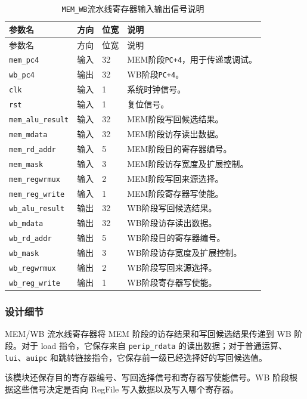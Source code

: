\documentclass[UTF8,a4paper,12pt]{ctexart}
\newcommand{\code}[1]{\texttt{#1}}
\begin{document}
{\footnotesize
\renewcommand{\arraystretch}{1.12}
\begin{longtable}{p{3.2cm}p{1.5cm}p{2.1cm}p{7.0cm}}
\caption{\code{MEM\_WB}流水线寄存器输入输出信号说明}\\
\toprule
参数名 & 方向 & 位宽 & 说明 \\
\midrule
\endfirsthead
\toprule
参数名 & 方向 & 位宽 & 说明 \\
\midrule
\endhead
\code{mem\_pc4} & 输入 & 32 & MEM阶段\code{PC+4}，用于传递或调试。 \\
\code{wb\_pc4} & 输出 & 32 & WB阶段\code{PC+4}。 \\
\code{clk} & 输入 & 1 & 系统时钟信号。 \\
\code{rst} & 输入 & 1 & 复位信号。 \\
\code{mem\_alu\_result} & 输入 & 32 & MEM阶段写回候选结果。 \\
\code{mem\_mdata} & 输入 & 32 & MEM阶段访存读出数据。 \\
\code{mem\_rd\_addr} & 输入 & 5 & MEM阶段目的寄存器编号。 \\
\code{mem\_mask} & 输入 & 3 & MEM阶段访存宽度及扩展控制。 \\
\code{mem\_regwrmux} & 输入 & 2 & MEM阶段写回来源选择。 \\
\code{mem\_reg\_write} & 输入 & 1 & MEM阶段寄存器写使能。 \\
\code{wb\_alu\_result} & 输出 & 32 & WB阶段写回候选结果。 \\
\code{wb\_mdata} & 输出 & 32 & WB阶段访存读出数据。 \\
\code{wb\_rd\_addr} & 输出 & 5 & WB阶段目的寄存器编号。 \\
\code{wb\_mask} & 输出 & 3 & WB阶段访存宽度及扩展控制。 \\
\code{wb\_regwrmux} & 输出 & 2 & WB阶段写回来源选择。 \\
\code{wb\_reg\_write} & 输出 & 1 & WB阶段寄存器写使能。 \\
\bottomrule
\end{longtable}
}

\subsubsection*{设计细节}

MEM/WB 流水线寄存器将 MEM 阶段的访存结果和写回候选结果传递到 WB 阶段。对于 load 指令，它保存来自 \code{perip\_rdata} 的读出数据；对于普通运算、\code{lui}、\code{auipc} 和跳转链接指令，它保存前一级已经选择好的写回候选值。

该模块还保存目的寄存器编号、写回选择信号和寄存器写使能信号。WB 阶段根据这些信号决定是否向 RegFile 写入数据以及写入哪个寄存器。
\end{document}
